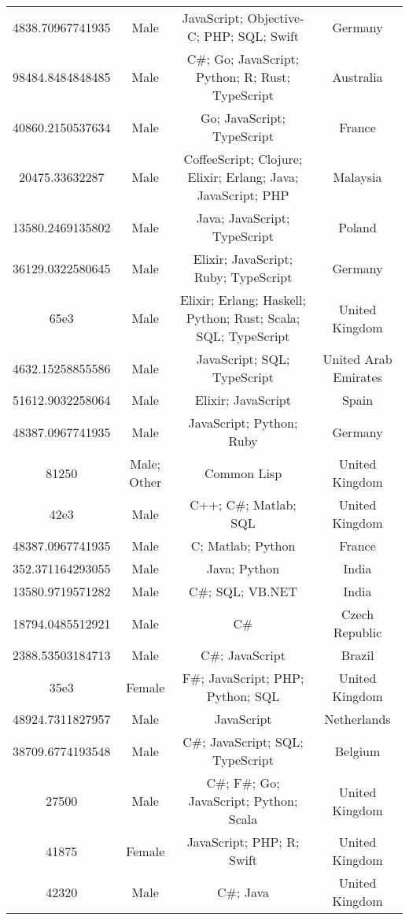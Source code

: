\begin{center}
\begin{tabular}{ |c|c|c|c| }
4838.70967741935  &  Male  &  JavaScript; Objective-C; PHP; SQL; Swift  &  Germany  \\ 
98484.8484848485  &  Male  &  C\#; Go; JavaScript; Python; R; Rust; TypeScript  &  Australia  \\ 
40860.2150537634  &  Male  &  Go; JavaScript; TypeScript  &  France  \\ 
20475.33632287  &  Male  &  CoffeeScript; Clojure; Elixir; Erlang; Java; JavaScript; PHP  &  Malaysia  \\ 
13580.2469135802  &  Male  &  Java; JavaScript; TypeScript  &  Poland  \\ 
36129.0322580645  &  Male  &  Elixir; JavaScript; Ruby; TypeScript  &  Germany  \\ 
65e3  &  Male  &  Elixir; Erlang; Haskell; Python; Rust; Scala; SQL; TypeScript  &  United Kingdom  \\ 
4632.15258855586  &  Male  &  JavaScript; SQL; TypeScript  &  United Arab Emirates  \\ 
51612.9032258064  &  Male  &  Elixir; JavaScript  &  Spain  \\ 
48387.0967741935  &  Male  &  JavaScript; Python; Ruby  &  Germany  \\ 
81250  &  Male; Other  &  Common Lisp  &  United Kingdom  \\ 
42e3  &  Male  &  C++; C\#; Matlab; SQL  &  United Kingdom  \\ 
48387.0967741935  &  Male  &  C; Matlab; Python  &  France  \\ 
352.371164293055  &  Male  &  Java; Python  &  India  \\ 
13580.9719571282  &  Male  &  C\#; SQL; VB.NET  &  India  \\ 
18794.0485512921  &  Male  &  C\#  &  Czech Republic  \\ 
2388.53503184713  &  Male  &  C\#; JavaScript  &  Brazil  \\ 
35e3  &  Female  &  F\#; JavaScript; PHP; Python; SQL  &  United Kingdom  \\ 
48924.7311827957  &  Male  &  JavaScript  &  Netherlands  \\ 
38709.6774193548  &  Male  &  C\#; JavaScript; SQL; TypeScript  &  Belgium  \\ 
27500  &  Male  &  C\#; F\#; Go; JavaScript; Python; Scala  &  United Kingdom  \\ 
41875  &  Female  &  JavaScript; PHP; R; Swift  &  United Kingdom  \\ 
42320  &  Male  &  C\#; Java  &  United Kingdom  \\ 

\end{tabular}
\end{center}
